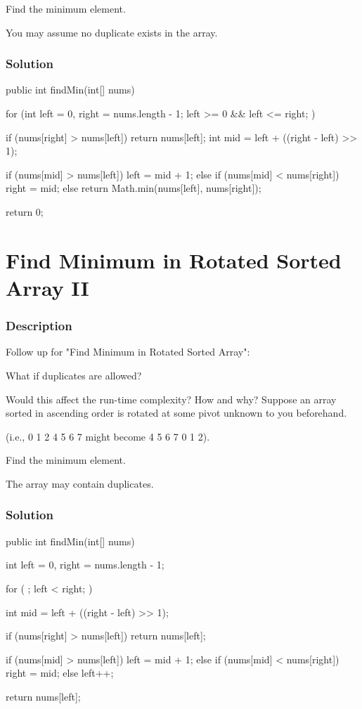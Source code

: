 Find the minimum element.

You may assume no duplicate exists in the array.
\subsubsection{Solution}

\begin{Code}
public int findMin(int[] nums) {
    for (int left = 0, right = nums.length - 1; left >= 0 && left <= right; ) {
        if (nums[right] > nums[left]) {
            return nums[left];
        }
        int mid = left + ((right - left) >> 1);

        if (nums[mid] > nums[left]) {
            left = mid + 1;
        } else if (nums[mid] < nums[right]) {
            right = mid;
        } else {
            return Math.min(nums[left], nums[right]);
        }
    }
    return 0;
}
\end{Code}

\newpage

\section{Find Minimum in Rotated Sorted Array II} %

\subsubsection{Description}
Follow up for "Find Minimum in Rotated Sorted Array":

What if duplicates are allowed?

Would this affect the run-time complexity? How and why?
Suppose an array sorted in ascending order is rotated at some pivot unknown to you beforehand.

(i.e., 0 1 2 4 5 6 7 might become 4 5 6 7 0 1 2).

Find the minimum element.

The array may contain duplicates.

\subsubsection{Solution}

\begin{Code}
public int findMin(int[] nums) {
    int left = 0, right = nums.length - 1;

    for ( ; left < right; ) {
        int mid = left + ((right - left) >> 1);

        if (nums[right] > nums[left]) {
            return nums[left];
        }

        if (nums[mid] > nums[left]) {
            left = mid + 1;
        } else if (nums[mid] < nums[right]) {
            right = mid;
        } else {
            left++;
        }
    }

    return nums[left];
}
\end{Code}

